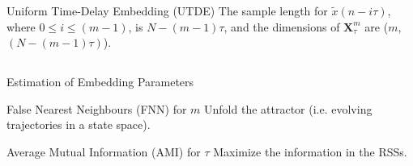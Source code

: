 {{{\begin{frame}{Uniform Time-Delay Embedding (UTDE)}
The sample length for $\tilde{x}(n-i\tau)$, where $0 \leq i \leq (m-1)$, is $N-(m-1)\tau$,
and the dimensions of $\mathbf{X}^{m}_{\tau}$ are ($m$,$(N-(m-1)\tau)$).

\end{frame}
}


\subsection{}
{

\begin{frame}{Estimation of Embedding Parameters }

\begin{block}{False Nearest Neighbours (FNN) for $m$}
Unfold the attractor (i.e. evolving trajectories
in a state space).
\end{block}

\begin{block}{Average Mutual Information (AMI) for $\tau$}
Maximize the information in the RSSs.
\end{block}
	
\end{frame}
}


}}
